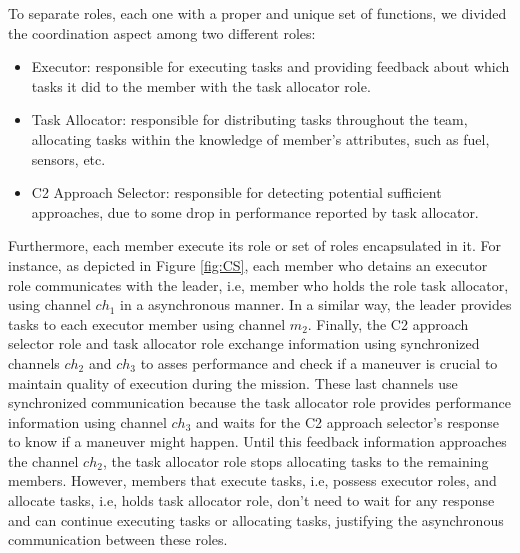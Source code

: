 To separate roles, each one with a proper and unique set of functions, we divided the coordination aspect among two different roles:

\begin{itemize}
    \item Executor: responsible for executing tasks and providing feedback about which tasks it did to the member with the task allocator role.
    \item Task Allocator: responsible for distributing tasks throughout the team, allocating tasks within the knowledge of member's attributes, such as fuel, sensors, etc.
    \item C2 Approach Selector: responsible for detecting potential sufficient approaches, due to some drop in performance reported by task allocator.
\end{itemize}

Furthermore, each member execute its role or set of roles encapsulated in it. For instance, as depicted in Figure \ref{fig:CS}, each member who detains an executor role communicates with the leader, i.e, member who holds the role task allocator, using channel \textit{$ch_1$} in a asynchronous manner. In a similar way, the leader provides tasks to each executor member using channel \textit{$m_2$}. Finally, the C2 approach selector role and task allocator role exchange information using synchronized channels \textit{$ch_2$} and \textit{$ch_3$} to asses performance and check if a maneuver is crucial to maintain quality of execution during the mission. These last channels use synchronized communication because the task allocator role provides performance information using channel \textit{$ch_3$} and waits for the C2 approach selector's response to know if a maneuver might happen. Until this feedback information approaches the channel \textit{$ch_2$}, the task allocator role stops allocating tasks to the remaining members. However, members that execute tasks, i.e, possess executor roles, and allocate tasks, i.e, holds task allocator role, don't need to wait for any response and can continue executing tasks or allocating tasks, justifying the asynchronous communication between these roles.